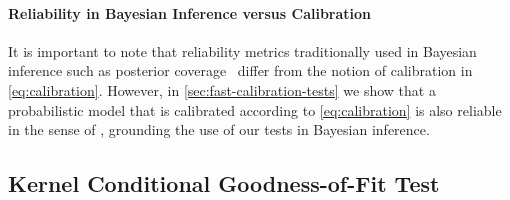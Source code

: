 \documentclass{uai2023} %
\begin{document}
\paragraph{Reliability in Bayesian Inference versus Calibration}
It is important to note that reliability metrics traditionally
used in Bayesian inference such as posterior coverage~\cite{Hermans2021}
differ from the notion of calibration in \cref{eq:calibration}.
However, in \cref{sec:fast-calibration-tests} we show that a probabilistic model that is calibrated according to \cref{eq:calibration} is also reliable in the sense of \citet{Hermans2021}, grounding the use of our tests in Bayesian inference.

\subsection{Kernel Conditional Goodness-of-Fit Test}
\end{document}
